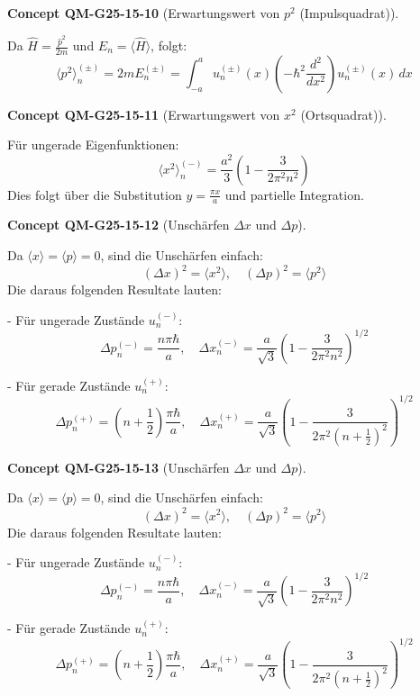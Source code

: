 \documentclass[10pt, letterpaper]{article}
\newcommand{\CustomHeading}[3]{%
  \par\medskip\noindent%
  \textbf{#1 #2} \textnormal{(#3)}.\enskip%
}
\newenvironment{CONC}[2]{\CustomHeading{Concept}{#1}{#2}}{}
\begin{document}
\begin{CONC}{QM-G25-15-10}{Erwartungswert von $p^2$ (Impulsquadrat)}
Da $\hat{H} = \frac{\hat{p}^2}{2m}$ und $E_n = \langle \hat{H} \rangle$, folgt:
\[
\langle p^2 \rangle_n^{(\pm)} = 2m E_n^{(\pm)} = \int_{-a}^{a} u_n^{(\pm)}(x) \left(-\hbar^2 \frac{d^2}{dx^2} \right) u_n^{(\pm)}(x)\, dx
\]
\end{CONC}

\begin{CONC}{QM-G25-15-11}{Erwartungswert von $x^2$ (Ortsquadrat)}
Für ungerade Eigenfunktionen:
\[
\langle x^2 \rangle_n^{(-)} = \frac{a^2}{3} \left(1 - \frac{3}{2\pi^2 n^2} \right)
\]
Dies folgt über die Substitution $y = \frac{\pi x}{a}$ und partielle Integration.
\end{CONC}

\begin{CONC}{QM-G25-15-12}{Unschärfen $\Delta x$ und $\Delta p$}
Da $\langle x \rangle = \langle p \rangle = 0$, sind die Unschärfen einfach:
\[
(\Delta x)^2 = \langle x^2 \rangle, \quad (\Delta p)^2 = \langle p^2 \rangle
\]
Die daraus folgenden Resultate lauten:

- Für ungerade Zustände \( u_n^{(-)} \):
  \[
  \Delta p_n^{(-)} = \frac{n \pi \hbar}{a}, \quad
  \Delta x_n^{(-)} = \frac{a}{\sqrt{3}} \left(1 - \frac{3}{2\pi^2 n^2} \right)^{1/2}
  \]

- Für gerade Zustände \( u_n^{(+)} \):
  \[
  \Delta p_n^{(+)} = \left(n + \frac{1}{2} \right) \frac{\pi \hbar}{a}, \quad
  \Delta x_n^{(+)} = \frac{a}{\sqrt{3}} \left(1 - \frac{3}{2\pi^2 (n + \frac{1}{2})^2} \right)^{1/2}
  \]
\end{CONC}

\begin{CONC}{QM-G25-15-13}{Unschärfen $\Delta x$ und $\Delta p$}
Da $\langle x \rangle = \langle p \rangle = 0$, sind die Unschärfen einfach:
\[
(\Delta x)^2 = \langle x^2 \rangle, \quad (\Delta p)^2 = \langle p^2 \rangle
\]
Die daraus folgenden Resultate lauten:

- Für ungerade Zustände \( u_n^{(-)} \):
  \[
  \Delta p_n^{(-)} = \frac{n \pi \hbar}{a}, \quad
  \Delta x_n^{(-)} = \frac{a}{\sqrt{3}} \left(1 - \frac{3}{2\pi^2 n^2} \right)^{1/2}
  \]

- Für gerade Zustände \( u_n^{(+)} \):
  \[
  \Delta p_n^{(+)} = \left(n + \frac{1}{2} \right) \frac{\pi \hbar}{a}, \quad
  \Delta x_n^{(+)} = \frac{a}{\sqrt{3}} \left(1 - \frac{3}{2\pi^2 (n + \frac{1}{2})^2} \right)^{1/2}
  \]
\end{CONC}
\end{document}
